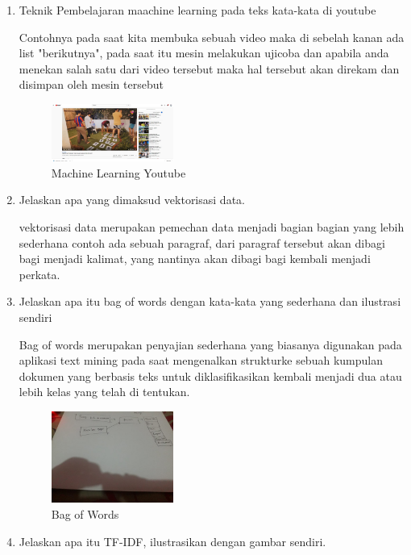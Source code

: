 \begin{enumerate}
        \item Teknik Pembelajaran maachine learning pada teks kata-kata di youtube
        
        Contohnya pada saat kita membuka sebuah video maka di sebelah kanan ada list "berikutnya", pada saat itu mesin melakukan ujicoba dan apabila anda menekan salah satu dari video tersebut maka hal tersebut akan direkam dan disimpan oleh mesin tersebut

        \begin{figure}[H]
            \includegraphics[width=4cm]{figures/1174039/chapter4/youtube.jpg}
            \centering
            \caption{Machine Learning Youtube}
        \end{figure}

        \item Jelaskan apa yang dimaksud vektorisasi data.
        
        vektorisasi data merupakan pemechan data menjadi bagian bagian yang lebih sederhana contoh ada sebuah paragraf, dari paragraf tersebut akan dibagi bagi menjadi kalimat, yang nantinya akan dibagi bagi kembali menjadi perkata.

        \item Jelaskan apa itu bag of words dengan kata-kata yang sederhana dan ilustrasi sendiri
        
        Bag of words merupakan penyajian sederhana yang biasanya digunakan pada aplikasi text mining pada saat mengenalkan strukturke sebuah kumpulan dokumen yang berbasis teks untuk diklasifikasikan kembali menjadi dua atau lebih kelas yang telah di tentukan.

        \begin{figure}[H]
            \includegraphics[width=4cm]{figures/1174039/chapter4/box.jpeg}
            \centering
            \caption{Bag of Words}
        \end{figure}

        \item Jelaskan apa itu TF-IDF, ilustrasikan dengan gambar sendiri.
        

\end{enumerate}
